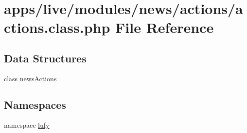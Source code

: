 \hypertarget{live_2modules_2news_2actions_2actions_8class_8php}{\section{apps/live/modules/news/actions/actions.class.\-php File Reference}
\label{live_2modules_2news_2actions_2actions_8class_8php}
}
\subsection*{Data Structures}
\begin{DoxyCompactItemize}
\item 
class \hyperlink{classnews_actions}{news\-Actions}
\end{DoxyCompactItemize}
\subsection*{Namespaces}
\begin{DoxyCompactItemize}
\item 
namespace \hyperlink{namespacelufy}{lufy}
\end{DoxyCompactItemize}
